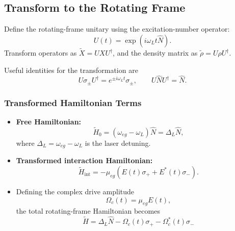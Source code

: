 \subsection{Transform to the Rotating Frame}

Define the rotating-frame unitary using the excitation-number operator:
\begin{equation}
	U(t) = \exp\left(i\omega_{L} t \hat{N}\right).
	\label{eq:UnitaryRotatingFrame}
\end{equation}
Transform operators as \(\tilde{X} = UXU^\dagger\), and the density matrix as \(\tilde{\rho} = U\rho U^\dagger\).

Useful identities for the transformation are
\begin{equation}
	U\sigma_\pm U^\dagger = e^{\pm i\omega_{L} t}\sigma_\pm, \qquad
	U\hat{N}U^\dagger = \hat{N}.
	\label{eq:TransformationIdentities}
\end{equation}

\subsubsection{Transformed Hamiltonian Terms}

\begin{itemize}
	\item \textbf{Free Hamiltonian:}
	      \begin{equation}
		      \tilde{H}_0 = (\omega_{eg} - \omega_{L})\hat{N} = \Delta_L \hat{N},
		      \label{eq:TransformedFreeHamiltonian}
	      \end{equation}
	      where \(\Delta_L = \omega_{eg} - \omega_{L}\) is the laser detuning.

	\item \textbf{Transformed interaction Hamiltonian:}
	      \begin{equation}
		      \tilde{H}_{\mathrm{int}} = -\mu_{eg}\left(E(t)\sigma_+ + E^*(t)\sigma_-\right).
		      \label{eq:TransformedInteractionHamiltonian}
	      \end{equation}

	\item Defining the complex drive amplitude
	      \begin{equation}
		      \Omega_c(t) = \mu_{eg}E(t),
		      \label{eq:TimeDepRabiFreq}
	      \end{equation}
	      the total rotating-frame Hamiltonian becomes
	      \begin{equation}
		      \boxed{
			      \tilde{H} = \Delta_L \hat{N} - \Omega_c(t)\sigma_+ - \Omega_c^*(t)\sigma_-
		      }
		      \label{eq:RotatingFrameHamiltonian}
	      \end{equation}
\end{itemize}

